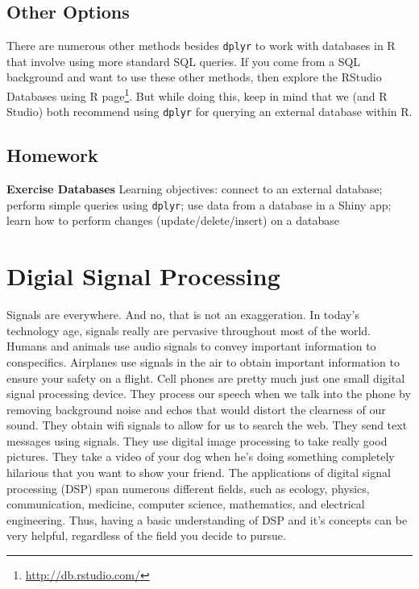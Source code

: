 \documentclass[]{krantz}
\renewcommand{\href}[2]{#2\footnote{\url{#1}}}
\begin{document}
\hypertarget{other-options}{%
\section{Other Options}\label{other-options}}

There are numerous other methods besides \texttt{dplyr} to work with databases in R that involve using more standard SQL queries. If you come from a SQL background and want to use these other methods, then explore the \href{http://db.rstudio.com/}{RStudio Databases using R page}. But while doing this, keep in mind that we (and R Studio) both recommend using \texttt{dplyr} for querying an external database within R.

\hypertarget{homework-9}{%
\section{Homework}\label{homework-9}}

\textbf{Exercise Databases} Learning objectives: connect to an external database; perform simple queries using \texttt{dplyr}; use data from a database in a Shiny app; learn how to perform changes (update/delete/insert) on a database

\hypertarget{digial-signal-processing}{%
\chapter{Digial Signal Processing}\label{digial-signal-processing}}

Signals are everywhere. And no, that is not an exaggeration. In today's technology age, signals really are pervasive throughout most of the world. Humans and animals use audio signals to convey important information to conspecifics. Airplanes use signals in the air to obtain important information to ensure your safety on a flight. Cell phones are pretty much just one small digital signal processing device. They process our speech when we talk into the phone by removing background noise and echos that would distort the clearness of our sound. They obtain wifi signals to allow for us to search the web. They send text messages using signals. They use digital image processing to take really good pictures. They take a video of your dog when he's doing something completely hilarious that you want to show your friend. The applications of digital signal processing (DSP) span numerous different fields, such as ecology, physics, communication, medicine, computer science, mathematics, and electrical engineering. Thus, having a basic understanding of DSP and it's concepts can be very helpful, regardless of the field you decide to pursue.
\end{document}
